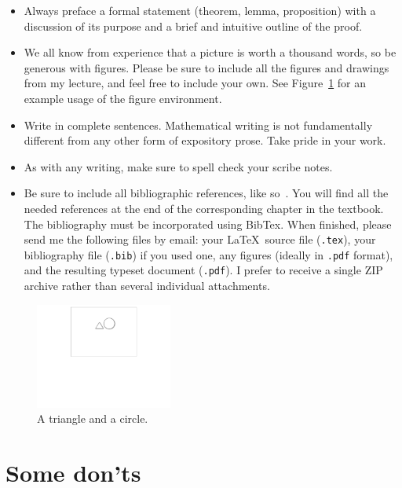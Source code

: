 \documentclass[usletter]{article}
\begin{document}
\begin{itemize}
\item Always preface a formal statement (theorem,
lemma, proposition) with a discussion of its purpose
and a brief and intuitive outline of the proof.

\item We all know from experience that a picture is
worth a thousand words, so be generous with figures.
Please be sure to include all the figures and drawings
from my lecture, and feel free to include your own. See
Figure~\ref{fig:triangle-circle} for an example usage
of the figure environment. 

\item Write in complete sentences.  Mathematical
writing is not fundamentally different from any other
form of expository prose. Take pride in your work. 

\item As with any writing, make sure to spell check
your scribe notes. 

\item Be sure to include all bibliographic references,
like so~\cite{textbook}. You will find all the needed
references at the end of the corresponding chapter in the
textbook. The bibliography must be incorporated using
BibTex.  When finished, please send me the following
files by email: your \LaTeX\ source file ({\tt .tex}),
your bibliography file ({\tt .bib}) if you used one,
any figures (ideally in {\tt .pdf} format), and the
resulting typeset document ({\tt .pdf}).   I prefer to
receive a single ZIP archive rather than several
individual attachments.
\end{itemize}

\begin{figure}
\begin{center}
\includegraphics[width=0.4\textwidth]{triangle-circle}
\end{center}
\caption{A triangle and a circle.}
\label{fig:triangle-circle}
\end{figure}

\section{Some don'ts}
\end{document}

